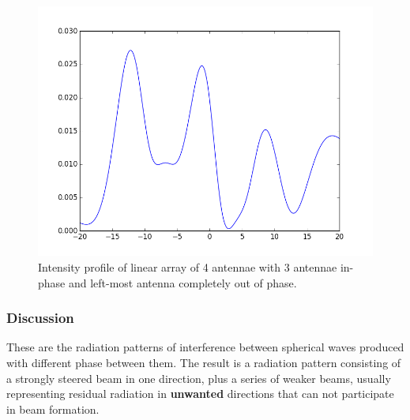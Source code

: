 \begin{figure}[!h]
	\centering	
	\includegraphics[scale=0.45]{figure_4.png}
    \caption{\label{fig:phase_2} Intensity profile of linear array of 4 antennae with 3 antennae in-phase and left-most antenna completely out of phase.}
\end{figure}

\subsubsection{Discussion}

These are the radiation patterns of interference between spherical waves produced with different phase between them. The result is a radiation pattern consisting of a strongly steered beam in one direction, plus a series of weaker beams, usually representing residual radiation in \textbf{unwanted} directions that can not participate in beam formation.

